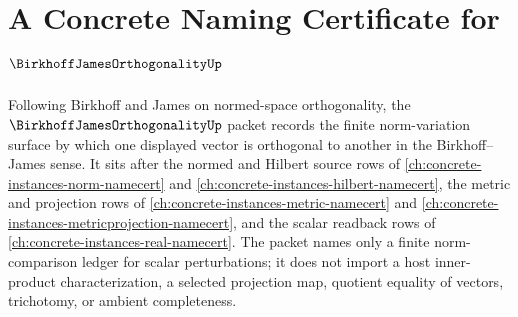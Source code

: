 \chapter{A Concrete Naming Certificate for $\BirkhoffJamesOrthogonalityUp$}
\label{ch:concrete-instances-birkhoff-james-orthogonality-namecert}

Following Birkhoff and James on normed-space orthogonality, the $\BirkhoffJamesOrthogonalityUp$ packet records the finite norm-variation surface by which one displayed vector is orthogonal to another in the Birkhoff--James sense. It sits after the normed and Hilbert source rows of \autoref{ch:concrete-instances-norm-namecert} and \autoref{ch:concrete-instances-hilbert-namecert}, the metric and projection rows of \autoref{ch:concrete-instances-metric-namecert} and \autoref{ch:concrete-instances-metricprojection-namecert}, and the scalar readback rows of \autoref{ch:concrete-instances-real-namecert}. The packet names only a finite norm-comparison ledger for scalar perturbations; it does not import a host inner-product characterization, a selected projection map, quotient equality of vectors, trichotomy, or ambient completeness.

